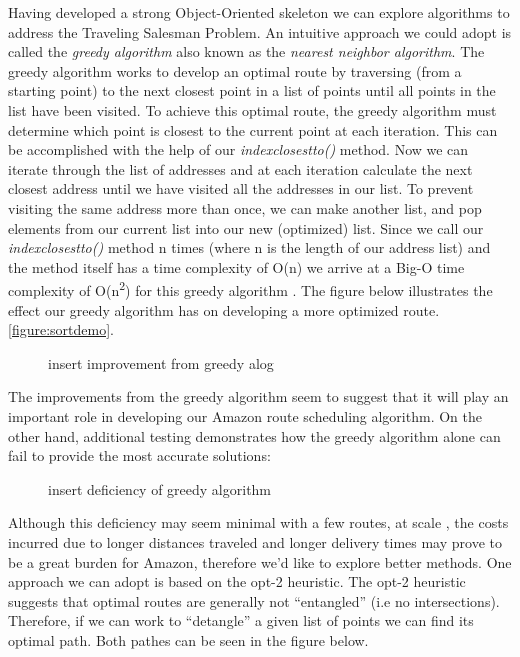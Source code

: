 \documentclass[letterpaper]{article}
\begin{document}
    Having developed a strong Object-Oriented skeleton we can 
    explore algorithms to address the Traveling Salesman Problem. 
    An intuitive approach we could adopt is called the 
    \emph{greedy algorithm} also known as the \emph{nearest neighbor algorithm}. \cite[p.~458]{cite:eijkhout2022}  
    The greedy algorithm works to develop an optimal route by traversing (from a starting point)  
    to the next closest point in a list of points until all points in the list have been visited.
    To achieve this optimal route, the greedy algorithm must 
    determine which point is closest to the current point at each iteration.
    This can be accomplished with the help of our \emph{index\textunderscore closest\textunderscore to()}
    method. Now we can iterate through the list of addresses 
    and at each iteration calculate the next closest address 
    until we have visited all the addresses in our list. To 
    prevent visiting the same address more than once, we can 
    make another list, and pop elements from our current list 
    into our new (optimized) list. Since we call our 
    \emph{index\textunderscore closest\textunderscore to()} 
    method n times (where n is the length of our address list) 
    and the method itself has a time complexity of O(n) we 
    arrive at a Big-O time complexity of O(n\textsuperscript{2}) for this 
    greedy algorithm . The figure below illustrates the 
    effect our greedy algorithm has on developing a more 
    optimized route.     \ref{figure:sortdemo}.
    \begin{figure}[h]
        \caption{insert improvement from greedy alog }
    \end{figure}
    The improvements from the greedy algorithm seem to suggest that it 
    will play an important role in developing our Amazon route scheduling 
    algorithm. On the other hand, additional testing demonstrates how 
    the greedy algorithm alone can fail to provide the most accurate solutions:
    
    \begin{figure}[h]
        \caption{ insert deficiency of greedy algorithm }
    \end{figure}
    
    Although this deficiency may seem minimal with a few routes, at scale , 
    the costs incurred due to longer distances traveled and longer delivery 
    times may prove to be a great burden for Amazon, therefore we'd like to 
    explore better methods. One approach we can adopt is based on the opt-2 
    heuristic. The opt-2 heuristic suggests that optimal routes are generally 
    not “entangled” (i.e no intersections). Therefore, if we can work to “detangle” 
    a given list of points we can find its optimal path. Both pathes can be seen 
    in the figure below. 
\end{document}
